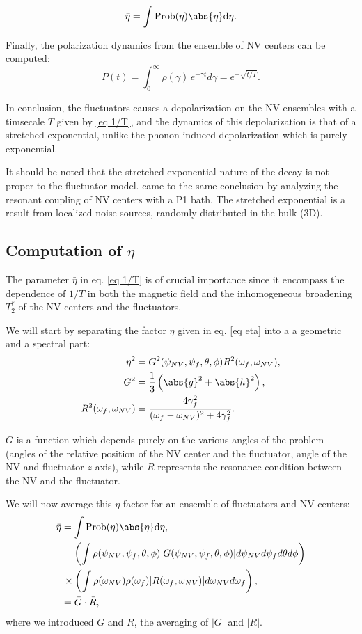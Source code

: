 \documentclass[a4paper,11pt]{report}
\begin{document}
\begin{equation}
\bar \eta = \int \rm{Prob}(\eta) \abs{\eta} d\eta.
\end{equation}

Finally, the polarization dynamics from the ensemble of NV centers can be computed:
\begin{equation}
P(t)=\int_0^\infty \rho(\gamma)\, e^{-\gamma t}d\gamma= e^{-\sqrt{t/T}}.
\end{equation}

In conclusion, the fluctuators causes a depolarization on the NV ensembles with a timsecale $T$ given by \ref{eq 1/T}, and the dynamics of this depolarization is that of a stretched exponential, unlike the phonon-induced depolarization which is purely exponential. 

It should be noted that the stretched exponential nature of the decay is not proper to the fluctuator model. \citep{hall2016detection} came to the same conclusion by analyzing the resonant coupling of NV centers with a P1 bath. The stretched exponential is a result from localized noise sources, randomly distributed in the bulk (3D).

\subsection{Computation of $\bar \eta$}
\label{sec computation eta}
The parameter $\bar \eta$ in eq. \ref{eq 1/T} is of crucial importance since it encompass the dependence of $1/T$ in both the magnetic field and the inhomogeneous broadening $T_2^*$ of the NV centers and the fluctuators.

We will start by separating the factor $\eta$ given in eq. \ref{eq eta} into a a geometric and a spectral part:
\begin{align}
\eta^2&=G^2(\psi_{NV},\psi_f,\theta,\phi) R^2(\omega_f,\omega_{NV}), \\
G^2&=\frac{1}{3}\left(\abs{g}^2+\abs{h}^2 \right),  \\ 
R^2(\omega_f,\omega_{NV}) &= \frac{4\gamma_f^2}{(\omega_f - \omega_{NV})^2+4\gamma_f^2}.
\end{align}

$G$ is a function which depends purely on the various angles of the problem (angles of the relative position of the NV center and the fluctuator, angle of the NV and fluctuator $z$ axis), while $R$ represents the resonance condition between the NV and the fluctuator.

We will now average this $\eta$ factor for an ensemble of fluctuators and NV centers:
\begin{align*}
\bar \eta &= \int \rm{Prob}(\eta) \abs{\eta} d\eta, \\
&= \left(\int \rho(\psi_{NV},\psi_f,\theta,\phi) |G(\psi_{NV},\psi_f,\theta,\phi)| d\psi_{NV} d\psi_f d\theta d\phi \right) \\
&\, \times \left( \int \rho(\omega_{NV}) \rho(\omega_{f}) |R(\omega_f,\omega_{NV})| d\omega_{NV} d\omega_{f} \right), \\
&= \bar G \cdot \bar R,
\end{align*}
where we introduced $\bar G$ and $\bar R$, the averaging of $|G|$ and $|R|$.
\end{document}
